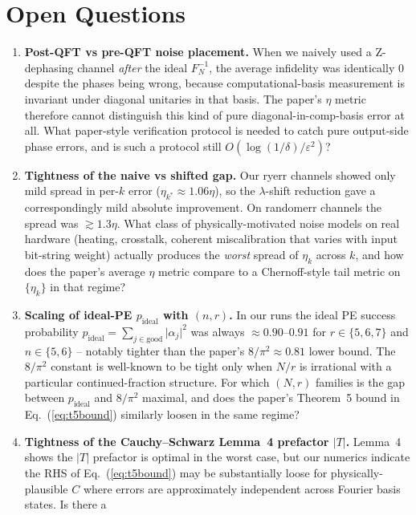 \documentclass[11pt]{article}
\newcommand{\eq}[1]{Eq.~(\ref{eq:#1})}
\begin{document}
\section{Open Questions}

\begin{enumerate}
\item[\textbf{Q1}] \textbf{Post-QFT vs pre-QFT noise placement.}  When we
naively used a Z-dephasing channel \emph{after} the ideal $F_N^{-1}$, the
average infidelity was identically $0$ despite the phases being wrong,
because computational-basis measurement is invariant under diagonal
unitaries in that basis.  The paper's $\eta$ metric therefore cannot
distinguish this kind of pure diagonal-in-comp-basis error at all.  What
paper-style verification protocol is needed to catch pure output-side
phase errors, and is such a protocol still $O(\log(1/\delta)/\varepsilon^2)$?
\item[\textbf{Q2}] \textbf{Tightness of the naive vs shifted gap.}  Our
ryerr channels showed only mild spread in per-$k$ error
($\eta_{k^*} \approx 1.06\eta$), so the $\lambda$-shift reduction gave a
correspondingly mild absolute improvement.  On randomerr channels the
spread was $\gtrsim 1.3\eta$.  What class of physically-motivated noise
models on real hardware (heating, crosstalk, coherent miscalibration
that varies with input bit-string weight) actually produces the
\emph{worst} spread of $\eta_k$ across $k$, and how does the paper's
average $\eta$ metric compare to a Chernoff-style tail metric on
$\{\eta_k\}$ in that regime?
\item[\textbf{Q3}] \textbf{Scaling of ideal-PE $p_{\text{ideal}}$
with $(n, r)$.}  In our runs the ideal PE success probability
$p_{\text{ideal}} = \sum_{j \in \text{good}} \lvert\alpha_j\rvert^2$ was
always $\approx 0.90$--$0.91$ for $r \in \{5,6,7\}$ and $n \in \{5,6\}$
-- notably tighter than the paper's $8/\pi^2 \approx 0.81$ lower bound.
The $8/\pi^2$ constant is well-known to be tight only when $N/r$ is
irrational with a particular continued-fraction structure.  For which
$(N, r)$ families is the gap between $p_{\text{ideal}}$ and $8/\pi^2$
maximal, and does the paper's Theorem~5 bound in \eq{t5bound} similarly
loosen in the same regime?
\item[\textbf{Q4}] \textbf{Tightness of the Cauchy--Schwarz Lemma~4
prefactor $|T|$.}  Lemma~4 shows the $|T|$ prefactor is optimal in the
worst case, but our numerics indicate the RHS of \eq{t5bound} may be
substantially loose for physically-plausible $C$ where errors are
approximately independent across Fourier basis states.  Is there a

\end{enumerate}
\end{document}
